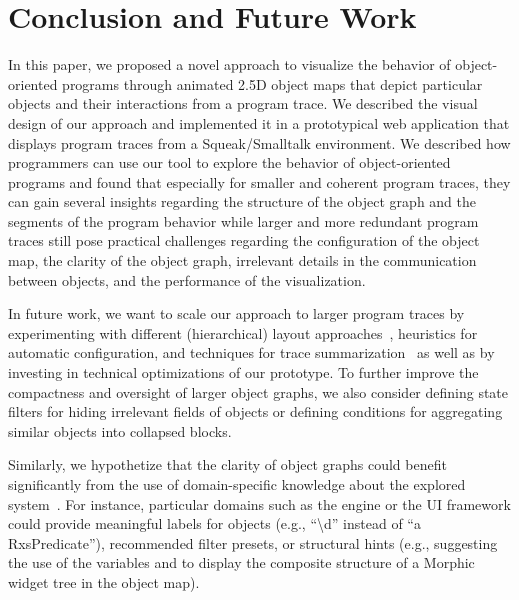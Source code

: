 \section{Conclusion and Future Work}
\label{sec:conclusion}

In this paper, we proposed a novel approach to visualize the behavior of object-oriented programs through animated 2.5D object maps that depict particular objects and their interactions from a program trace.
We described the visual design of our approach and implemented it in a prototypical web application that displays program traces from a Squeak/Smalltalk environment.
We described how programmers can use our tool to explore the behavior of object-oriented programs and found that especially for smaller and coherent program traces, they can gain several insights regarding the structure of the object graph and the segments of the program behavior while larger and more redundant program traces still pose practical challenges regarding the configuration of the object map, the clarity of the object graph, irrelevant details in the communication between objects, and the performance of the visualization.

In future work, we want to scale our approach to larger program traces by experimenting with different (hierarchical) layout approaches~\cite{kuhn2008consistent,atzberger2023visualization}, heuristics for automatic configuration, and techniques for trace summarization~\cite{hamouLhadj2006summarizing,noda2017identifying} as well as by investing in technical optimizations of our prototype.
To further improve the compactness and oversight of larger object graphs, we also consider defining state filters for hiding irrelevant fields of objects or defining conditions for aggregating similar objects into collapsed blocks.

Similarly, we hypothetize that the clarity of object graphs could benefit significantly from the use of domain-specific knowledge about the explored system~\cite{chis2014moldable}.
For instance, particular domains such as the  engine or the  UI framework could provide meaningful labels for objects (e.g., ``\textbackslash{}d'' instead of ``a RxsPredicate''), recommended filter presets, or structural hints (e.g., suggesting the use of the variables  and  to display the composite structure of a Morphic widget tree in the object map).

